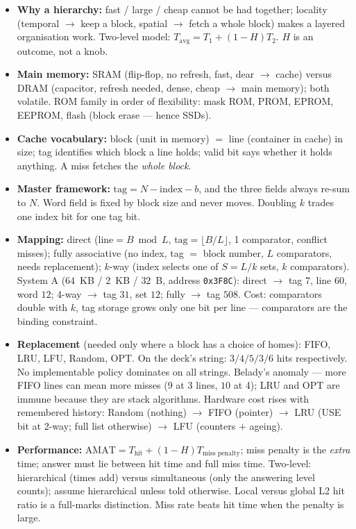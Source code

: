 \documentclass[11pt]{article}
\begin{document}
\begin{itemize}
  \item \textbf{Why a hierarchy:} fast / large / cheap cannot be had together; locality (temporal $\to$ keep a block, spatial $\to$ fetch a whole block) makes a layered organisation work. Two-level model: $T_{\text{avg}} = T_1 + (1-H)T_2$. $H$ is an outcome, not a knob.
  \item \textbf{Main memory:} SRAM (flip-flop, no refresh, fast, dear $\to$ cache) versus DRAM (capacitor, refresh needed, dense, cheap $\to$ main memory); both volatile. ROM family in order of flexibility: mask ROM, PROM, EPROM, EEPROM, flash (block erase --- hence SSDs).
  \item \textbf{Cache vocabulary:} block (unit in memory) $=$ line (container in cache) in size; tag identifies which block a line holds; valid bit says whether it holds anything. A miss fetches the \emph{whole block}.
  \item \textbf{Master framework:} $\text{tag} = N - \text{index} - b$, and the three fields always re-sum to $N$. Word field is fixed by block size and never moves. Doubling $k$ trades one index bit for one tag bit.
  \item \textbf{Mapping:} direct ($\text{line} = B \bmod L$, $\text{tag} = \lfloor B/L \rfloor$, 1 comparator, conflict misses); fully associative (no index, tag $=$ block number, $L$ comparators, needs replacement); $k$-way (index selects one of $S = L/k$ sets, $k$ comparators). System A ($64$~KB / $2$~KB / $32$~B, address \texttt{0x3F8C}): direct $\to$ tag $7$, line $60$, word $12$; 4-way $\to$ tag $31$, set $12$; fully $\to$ tag $508$. Cost: comparators double with $k$, tag storage grows only one bit per line --- comparators are the binding constraint.
  \item \textbf{Replacement} (needed only where a block has a choice of homes): FIFO, LRU, LFU, Random, OPT. On the deck's string: $3/4/5/3/6$ hits respectively. No implementable policy dominates on all strings. Belady's anomaly --- more FIFO lines can mean more misses ($9$ at 3 lines, $10$ at 4); LRU and OPT are immune because they are stack algorithms. Hardware cost rises with remembered history: Random (nothing) $\to$ FIFO (pointer) $\to$ LRU (USE bit at 2-way; full list otherwise) $\to$ LFU (counters $+$ ageing).
  \item \textbf{Performance:} $\text{AMAT} = T_{\text{hit}} + (1-H)T_{\text{miss penalty}}$; miss penalty is the \emph{extra} time; answer must lie between hit time and full miss time. Two-level: hierarchical (times add) versus simultaneous (only the answering level counts); assume hierarchical unless told otherwise. Local versus global L2 hit ratio is a full-marks distinction. Miss rate beats hit time when the penalty is large.

\end{itemize}
\end{document}
